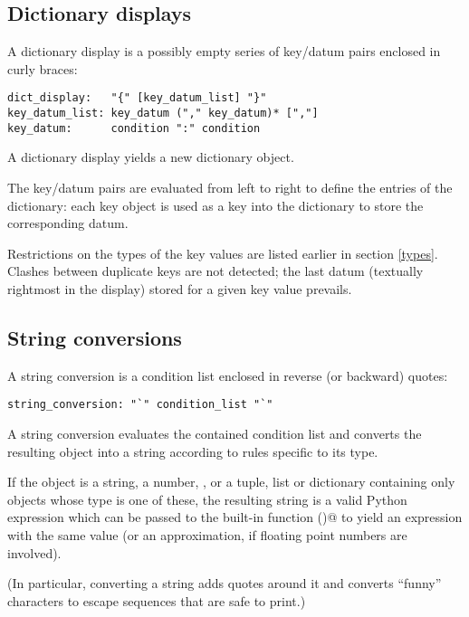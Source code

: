 \subsection{Dictionary displays} \label{dict}

A dictionary display is a possibly empty series of key/datum pairs
enclosed in curly braces:

\begin{verbatim}
dict_display:   "{" [key_datum_list] "}"
key_datum_list: key_datum ("," key_datum)* [","]
key_datum:      condition ":" condition
\end{verbatim}

A dictionary display yields a new dictionary object.

The key/datum pairs are evaluated from left to right to define the
entries of the dictionary: each key object is used as a key into the
dictionary to store the corresponding datum.

Restrictions on the types of the key values are listed earlier in
section \ref{types}.
Clashes between duplicate keys are not detected; the last
datum (textually rightmost in the display) stored for a given key
value prevails.

\subsection{String conversions}

A string conversion is a condition list enclosed in reverse (or
backward) quotes:

\begin{verbatim}
string_conversion: "`" condition_list "`"
\end{verbatim}

A string conversion evaluates the contained condition list and
converts the resulting object into a string according to rules
specific to its type.

If the object is a string, a number, \verb@None@, or a tuple, list or
dictionary containing only objects whose type is one of these, the
resulting string is a valid Python expression which can be passed to
the built-in function \verb@eval()@ to yield an expression with the
same value (or an approximation, if floating point numbers are
involved).

(In particular, converting a string adds quotes around it and converts
``funny'' characters to escape sequences that are safe to print.)

